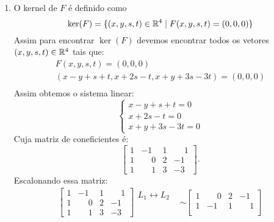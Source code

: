 \documentclass[12pt]{exam}
\begin{document}
    \solucao
    \begin{enumerate}[label={\alph*})]
        \item O kernel de $F$ é definido como
            \[
                \ker(F) = \{(x, y, s, t) \in \mathbb{R}^4 \mid F(x, y, s, t) = (0, 0, 0)\}
            \]
            Assim para encontrar $\ker(F)$ devemos encontrar todos os vetores $(x, y, s, t) \in \mathbb{R}^4$ tais que:
            \begin{align*}
                F(x, y, s, t) = (0, 0, 0)\\
                (x - y + s + t, x + 2s - t, x + y + 3s - 3t) = (0, 0, 0)\\
            \end{align*}
            Assim obtemos o sistema linear:
            \[
                \begin{cases}
                    x - y + s + t = 0\\
                    x + 2s - t = 0\\
                    x + y + 3s - 3t = 0
                \end{cases}
            \]
            Cuja matriz de coneficientes é:
            \[
                \begin{bmatrix}
                    1 & -1 & 1 & \phantom{-} 1\\
                    1 & \phantom{-} 0 & 2 & -1\\
                    1 & \phantom{-} 1 & 3 & -3
                \end{bmatrix}.
            \]
            Escalonando essa matriz:
            \begin{align*}
                \begin{bmatrix}
                    1 & -1 & 1 & \phantom{-} 1\\
                    1 & \phantom{-} 0 & 2 & -1\\
                    1 & \phantom{-} 1 & 3 & -3
                \end{bmatrix}
                \begin{array}{l}
                    L_1 \leftrightarrow L_2\\
                    \phantom{x}\\
                    \phantom{x}
                \end{array}&\sim
                \begin{bmatrix}
                    1 & \phantom{-} 0 & 2 & -1\\
                    1 & -1 & 1 & \phantom{-} 1\\

\end{bmatrix}
\end{align*}
\end{enumerate}
\end{document}

